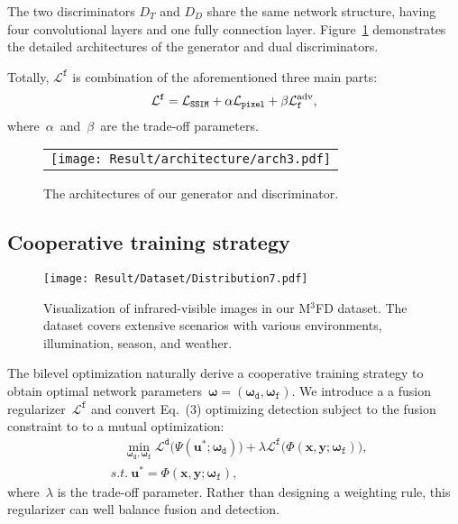 \documentclass[10pt,twocolumn,letterpaper]{article}
\begin{document}
The two discriminators $D_T$ and $D_D$ share the same network structure, having four convolutional layers and one fully connection layer. Figure~\ref{fig:arch} demonstrates the detailed architectures of the generator and dual discriminators.

Totally, $\mathcal{L}^{\mathtt{f}}$ is combination of the aforementioned three main parts: 
\vspace{-0.5cm} 
\begin{equation}
\mathcal{L}^{\mathtt{f}} = \mathcal{L}_{\mathtt{SSIM}} + \alpha \mathcal{L}_{\mathtt{pixel}} + \beta \mathcal{{L}}^{\rm adv}_{\mathtt{f}},\label{LG} 
\end{equation}
where~$\alpha$~and~$\beta$~are the trade-off parameters.
\vspace{-0.2cm} 
\begin{figure}[!htb]
	\centering
	\setlength{\tabcolsep}{1pt}
	\begin{tabular}{c}
		
		\texttt{[image: Result/architecture/arch3.pdf]}
		\\ 				
	\end{tabular}
	\vspace{-0.3cm}
	\caption{The architectures of our generator and discriminator.}
	\label{fig:arch}
\end{figure}
\vspace{-0.6cm} 
\subsection{Cooperative training strategy}
\begin{figure*}[!htb]
	\centering
	\setlength{\tabcolsep}{1pt} 
	
	\texttt{[image: Result/Dataset/Distribution7.pdf]}
	
	\caption{Visualization of infrared-visible images in our M$^3$FD dataset. The dataset covers extensive scenarios with various environments, illumination, season, and weather.}
	\label{fig:sample}
	\vspace{-0.5cm}  
\end{figure*}
The bilevel optimization naturally derive a cooperative training strategy to obtain  optimal network parameters~$\bm{\omega}=(\bm{\omega_{\mathtt{d}}}, \bm{\omega_{\mathtt{f}}})$. We introduce a a fusion regularizer~$\mathcal{L}^{\mathtt{f}}$ and convert Eq.~(3) optimizing detection subject to the fusion constraint to to a mutual optimization: 
\vspace{-0.2cm} 
\begin{eqnarray}
&\quad\min\limits_{\bm{\omega}_{\mathtt{d}}, \bm{\omega}_{\mathtt{f}}} \mathcal{L}^{\mathtt{d}}\big(\Psi(\mathbf{u}^*;\bm{\omega}_{\mathtt{d}})\big) + \lambda \mathcal{L}^{\mathtt{f}}\big(\Phi(\mathbf{x,y};\bm{\omega}_{\mathtt{f}})\big),\\
&s.t. \ \mathbf{u}^*=\Phi(\mathbf{x,y}; {\bm{\omega}_{\mathtt{f}}}),
\end{eqnarray}
where~$\lambda$ is the trade-off parameter. Rather than designing a weighting rule, this regularizer can well balance fusion and detection.
\end{document}
